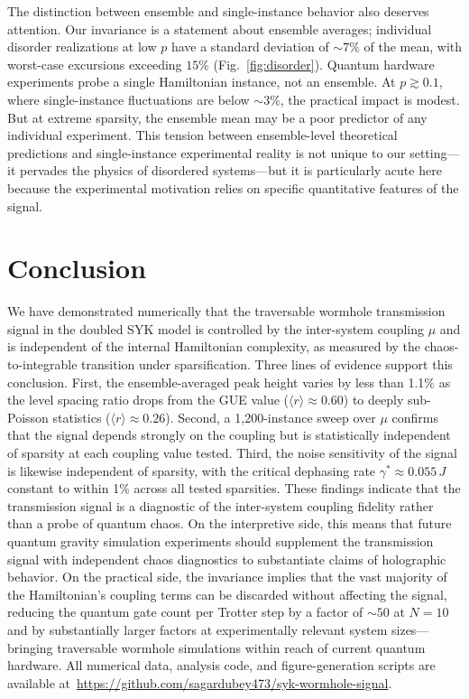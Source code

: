 \documentclass[aps,prd,twocolumn,superscriptaddress,nofootinbib,floatfix]{revtex4-2}
\newcommand{\avg}[1]{\langle #1 \rangle}
\begin{document}
The distinction between ensemble and single-instance behavior also
deserves attention. Our invariance is a statement about ensemble
averages; individual disorder realizations at low $p$ have a standard
deviation of ${\sim}7\%$ of the mean, with worst-case excursions exceeding
$15\%$ (Fig.~\ref{fig:disorder}). Quantum hardware
experiments probe a single Hamiltonian instance, not an ensemble. At
$p \gtrsim 0.1$, where single-instance fluctuations are below ${\sim}3\%$,
the practical impact is modest. But at extreme sparsity, the ensemble
mean may be a poor predictor of any individual experiment. This
tension between ensemble-level theoretical predictions and
single-instance experimental reality is not unique to our
setting---it pervades the physics of disordered systems---but it is
particularly acute here because the experimental motivation relies on
specific quantitative features of the signal.

\section{Conclusion}
\label{sec:conclusion}

We have demonstrated numerically that the traversable wormhole transmission
signal in the doubled SYK model is controlled by the inter-system coupling
$\mu$ and is independent of the internal Hamiltonian complexity, as measured
by the chaos-to-integrable transition under sparsification. Three lines of
evidence support this conclusion. First, the ensemble-averaged peak height
varies by less than 1.1\% as the level spacing ratio drops from the GUE
value ($\avg{r} \approx 0.60$) to deeply sub-Poisson statistics
($\avg{r} \approx 0.26$). Second, a 1{,}200-instance sweep over $\mu$
confirms that the signal depends strongly on the coupling but is
statistically independent of sparsity at each coupling value tested.
Third, the noise sensitivity of the signal is likewise independent of
sparsity, with the critical dephasing rate
$\gamma^* \approx 0.055\,J$ constant to within 1\% across all tested
sparsities. These findings indicate that the transmission signal is a
diagnostic of the inter-system coupling fidelity rather than a probe of
quantum chaos.  On the interpretive side, this means that future quantum
gravity simulation experiments should supplement the transmission signal
with independent chaos diagnostics to substantiate claims of holographic
behavior.  On the practical side, the invariance implies that the vast
majority of the Hamiltonian's coupling terms can be discarded without
affecting the signal, reducing the quantum gate count per Trotter step by
a factor of ${\sim}50$ at $N=10$ and by substantially larger factors at
experimentally relevant system sizes---bringing traversable wormhole
simulations within reach of current quantum hardware.
All numerical data, analysis code, and figure-generation scripts are
available at~\url{https://github.com/sagardubey473/syk-wormhole-signal}.

\renewcommand{\bibsection}{\par\vspace{10pt}\noindent\textbf{\large References}\par\vspace{4pt}}

\end{document}
